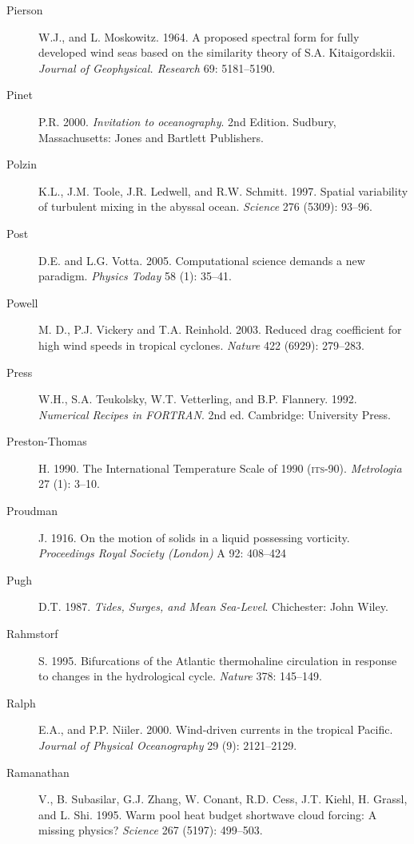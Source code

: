 \begin{description}
\item [Pierson]W.J., and L. Moskowitz. 1964. A proposed spectral form
  for fully developed wind seas based on the similarity theory of
  S.A. Kitaigordskii.  \textit{Journal of Geophysical. Research} 69:
  5181--5190.

\item [Pinet]P.R. 2000. \textit{Invitation to oceanography}. 2nd
  Edition.  Sudbury, Massachusetts: Jones and Bartlett Publishers.

\item [Polzin]K.L., J.M. Toole, J.R. Ledwell, and
  R.W. Schmitt. 1997. Spatial variability of turbulent mixing in the
  abyssal ocean. \textit{Science} 276 (5309): 93--96.

\item[Post]D.E. and L.G. Votta. 2005. Computational science demands a
  new paradigm. \textit{Physics Today} 58 (1): 35--41.
	
\item [Powell]M. D., P.J. Vickery and T.A. Reinhold. 2003. Reduced
  drag coefficient for high wind speeds in tropical
  cyclones. \textit{Nature} 422 (6929): 279--283.

\item [Press]W.H., S.A. Teukolsky, W.T. Vetterling, and
  B.P. Flannery. 1992.  \textit{Numerical Recipes in FORTRAN}. 2nd ed.
  Cambridge: University Press.

\item [Preston-Thomas]H. 1990. The International Temperature Scale of
  1990 (\textsc{its}-90). \textit{Metrologia} 27 (1): 3--10.

\item [Proudman]J. 1916. On the motion of solids in a liquid
  possessing vorticity. \textit{Proceedings Royal Society (London)} A
  92: 408--424

\item [Pugh]D.T. 1987. \textit{Tides, Surges, and Mean Sea-Level}.
  Chichester: John Wiley.

\item [Rahmstorf]S. 1995. Bifurcations of the Atlantic thermohaline
  circulation in response to changes in the hydrological
  cycle. \textit{Nature} 378: 145--149.

\item [Ralph]E.A., and P.P. Niiler. 2000. Wind-driven currents in the
  tropical Pacific. \textit{Journal of Physical Oceanography} 29 (9):
  2121--2129.

\item [Ramanathan]V., B. Subasilar, G.J. Zhang, W. Conant, R.D. Cess,
  J.T. Kiehl, H. Grassl, and L. Shi. 1995. Warm pool heat budget
  shortwave cloud forcing: A missing physics? \textit{Science} 267
  (5197): 499--503.


\end{description}
